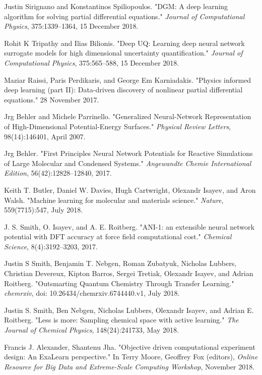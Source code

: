 \documentclass[conference]{IEEEtran}
\begin{document}
\begin{thebibliography}{00}
 Justin Sirignano and Konstantinos Spiliopoulos. "DGM: A deep learning algorithm for solving partial differential equations." \textit{Journal of Computational Physics}, 375:1339–1364, 15 December 2018.

 Rohit K Tripathy and Ilias Bilionis. "Deep UQ: Learning deep neural network surrogate models for high dimensional uncertainty quantification." \textit{Journal of Computational Physics}, 375:565–588, 15 December 2018.

 Maziar Raissi, Paris Perdikaris, and George Em Karniadakis. "Physics informed deep learning (part II): Data-driven discovery of nonlinear partial differential equations." 28 November 2017.

 Jrg Behler and Michele Parrinello. "Generalized Neural-Network Representation of High-Dimensional Potential-Energy Surfaces." \textit{Physical Review Letters}, 98(14):146401, April 2007.

 Jrg Behler. "First Principles Neural Network Potentials for Reactive Simulations of Large Molecular and Condensed Systems." \textit{Angewandte Chemie International Edition}, 56(42):12828–12840, 2017.

 Keith T. Butler, Daniel W. Davies, Hugh Cartwright, Olexandr Isayev, and Aron Walsh. "Machine learning for molecular and materials science." \textit{Nature}, 559(7715):547, July 2018.

 J. S. Smith, O. Isayev, and A. E. Roitberg. "ANI-1: an extensible neural network potential with DFT accuracy at force field computational cost." \textit{Chemical Science}, 8(4):3192–3203, 2017.

 Justin S Smith, Benjamin T. Nebgen, Roman Zubatyuk, Nicholas Lubbers, Christian Devereux, Kipton Barros, Sergei Tretiak, Olexandr Isayev, and Adrian Roitberg. "Outsmarting Quantum Chemistry Through Transfer Learning." \textit{chemrxiv}, doi: 10.26434/chemrxiv.6744440.v1, July 2018.

 Justin S. Smith, Ben Nebgen, Nicholas Lubbers, Olexandr Isayev, and Adrian E. Roitberg. "Less is more: Sampling chemical space with active learning." \textit{The Journal of Chemical Physics}, 148(24):241733, May 2018.

 Francis J. Alexander, Shantenu Jha. "Objective driven computational experiment design: An ExaLearn perspective." In Terry Moore, Geoffrey Fox (editors), \textit{Online Resource for Big Data and Extreme-Scale Computing Workshop}, November 2018.


\end{thebibliography}
\end{document}
